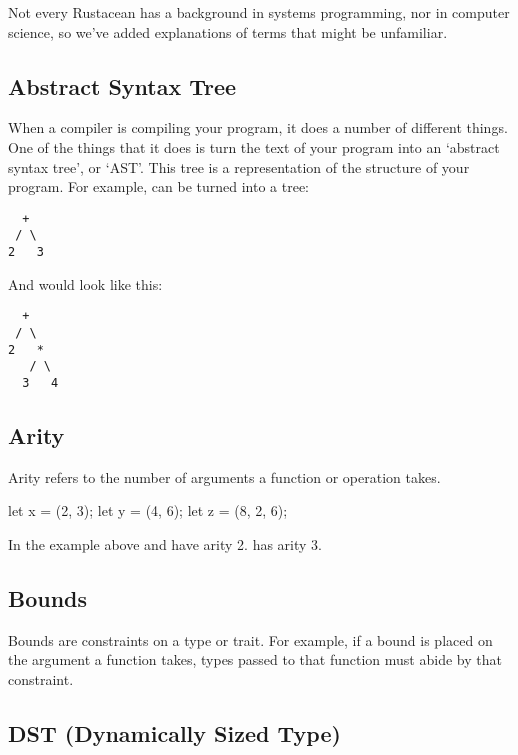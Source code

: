 Not every Rustacean has a background in systems programming, nor in computer science, so we've added explanations of terms that might be 
unfamiliar.

\subsection*{Abstract Syntax Tree}
\label{sec:gloss_syntaxtree}

When a compiler is compiling your program, it does a number of different things. One of the things that it does is turn 
the text of your program into an ‘abstract syntax tree’, or ‘AST’. This tree is a representation of the structure of your 
program. For example,  can be turned into a tree:

\begin{verbatim}
  +
 / \
2   3
\end{verbatim}

And  would look like this:

\begin{verbatim}
  +
 / \
2   *
   / \
  3   4
\end{verbatim}

\subsection*{Arity}
\label{sec:gloss_arity}

Arity refers to the number of arguments a function or operation takes.

\begin{rustc}
let x = (2, 3);
let y = (4, 6);
let z = (8, 2, 6);
\end{rustc}

In the example above  and  have arity 2.  has arity 3.

\subsection*{Bounds}
\label{sec:gloss_bounds}

Bounds are constraints on a type or trait. For example, if a bound is placed on the argument a function takes, 
types passed to that function must abide by that constraint.

\subsection*{DST (Dynamically Sized Type)}
\label{sec:gloss_dst}

